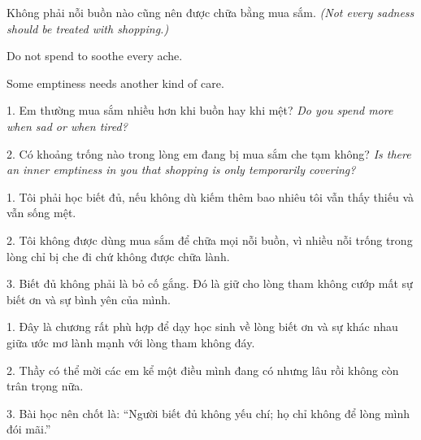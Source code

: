 \begin{baihoc}
Không phải nỗi buồn nào cũng nên được chữa bằng mua sắm.
\textit{(Not every sadness should be treated with shopping.)}
\end{baihoc}

\begin{ghinhoanh}
Do not spend to soothe every ache.

Some emptiness needs another kind of care.
\end{ghinhoanh}

\begin{tuhocnhanh}
1. Em thường mua sắm nhiều hơn khi buồn hay khi mệt? \textit{Do you spend more when sad or when tired?}

2. Có khoảng trống nào trong lòng em đang bị mua sắm che tạm không? \textit{Is there an inner emptiness in you that shopping is only temporarily covering?}
\end{tuhocnhanh}

\begin{turanminh}
1. Tôi phải học biết đủ, nếu không dù kiếm thêm bao nhiêu tôi vẫn thấy thiếu và vẫn sống mệt.

2. Tôi không được dùng mua sắm để chữa mọi nỗi buồn, vì nhiều nỗi trống trong lòng chỉ bị che đi chứ không được chữa lành.

3. Biết đủ không phải là bỏ cố gắng. Đó là giữ cho lòng tham không cướp mất sự biết ơn và sự bình yên của mình.
\end{turanminh}

\begin{dayhoc}
1. Đây là chương rất phù hợp để dạy học sinh về lòng biết ơn và sự khác nhau giữa ước mơ lành mạnh với lòng tham không đáy.

2. Thầy có thể mời các em kể một điều mình đang có nhưng lâu rồi không còn trân trọng nữa.

3. Bài học nên chốt là: ``Người biết đủ không yếu chí; họ chỉ không để lòng mình đói mãi.''
\end{dayhoc}